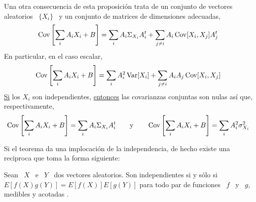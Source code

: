 {Una otra  consecuencia de  esta proposici\'on trata  de un conjunto  de vectores
aleatorios \ $\{ X_i \}$ \ y un conjunto de matrices de dimensiones adecuadas,
%
\[
\operatorname{Cov}\left[ \sum_i A_i X_i + B\right] =  \sum_i A_i \Sigma_{X_i} A_i^t + \sum_{j \ne
  i} A_i \operatorname{Cov}[X_i,X_j] A_j^t
\]
%
En particular, en el caso escalar,
%
\[
\operatorname{Cov}\left[ \sum_i A_i X_i + B \right]  = \sum_i A_i^2 \operatorname{Var}[X_i] + \sum_{j \ne i}
A_i A_j \operatorname{Cov}[X_i,X_j]
\]
%
\underline{Si}   los   $X_i$   son  independientes,   \underline{entonces}   las
covarianzas conjuntas son nulas as\'i que, respectivamente,
\[
\operatorname{Cov}\left[ \sum_i  A_i X_i +  B \right] =  \sum_i A_i \Sigma_{X_i}  A_i^t \qquad
\mbox{y}  \qquad  \operatorname{Cov}\left[  \sum_i  A_i   X_i  +  B  \right]  =  \sum_i  A_i^2
\sigma_{X_i}^2
\]

Si el  teorema da  una implocaci\'on  de la independencia,  de hecho  existe una
reciproca que toma la forma siguiente: }
%
\begin{teorema}
  Sean \ $X$ \ e \ $Y$ \ dos vectores aleatorios. Son independientes si y s\'olo
  si $E[f(X) g(Y)]=E[f(X)] E[g(Y)]$ para todo par  de funciones \ $f$ \ y \ $g$,
  medibles y acotadas .
\end{teorema}
%

\

